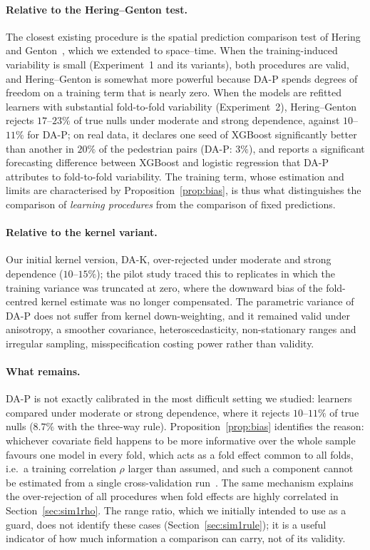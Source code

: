 \paragraph{Relative to the Hering--Genton test.} The closest existing procedure is the spatial prediction comparison test of Hering and Genton~\cite{hering2011}, which we extended to space--time. When the training-induced variability is small (Experiment~1 and its variants), both procedures are valid, and Hering--Genton is somewhat more powerful because DA-P spends degrees of freedom on a training term that is nearly zero. When the models are refitted learners with substantial fold-to-fold variability (Experiment~2), Hering--Genton rejects $17$--$23\%$ of true nulls under moderate and strong dependence, against $10$--$11\%$ for DA-P; on real data, it declares one seed of XGBoost significantly better than another in $20\%$ of the pedestrian pairs (DA-P: $3\%$), and reports a significant forecasting difference between XGBoost and logistic regression that DA-P attributes to fold-to-fold variability. The training term, whose estimation and limits are characterised by Proposition~\ref{prop:bias}, is thus what distinguishes the comparison of \emph{learning procedures} from the comparison of fixed predictions.

\paragraph{Relative to the kernel variant.} Our initial kernel version, DA-K, over-rejected under moderate and strong dependence ($10$--$15\%$); the pilot study traced this to replicates in which the training variance was truncated at zero, where the downward bias of the fold-centred kernel estimate was no longer compensated. The parametric variance of DA-P does not suffer from kernel down-weighting, and it remained valid under anisotropy, a smoother covariance, heteroscedasticity, non-stationary ranges and irregular sampling, misspecification costing power rather than validity.

\paragraph{What remains.} DA-P is not exactly calibrated in the most difficult setting we studied: learners compared under moderate or strong dependence, where it rejects $10$--$11\%$ of true nulls ($8.7\%$ with the three-way rule). Proposition~\ref{prop:bias} identifies the reason: whichever covariate field happens to be more informative over the whole sample favours one model in every fold, which acts as a fold effect common to all folds, i.e.\ a training correlation $\rho$ larger than assumed, and such a component cannot be estimated from a single cross-validation run~\cite{bengio2004}. The same mechanism explains the over-rejection of all procedures when fold effects are highly correlated in Section~\ref{sec:sim1rho}. The range ratio, which we initially intended to use as a guard, does not identify these cases (Section~\ref{sec:sim1rule}); it is a useful indicator of how much information a comparison can carry, not of its validity.

